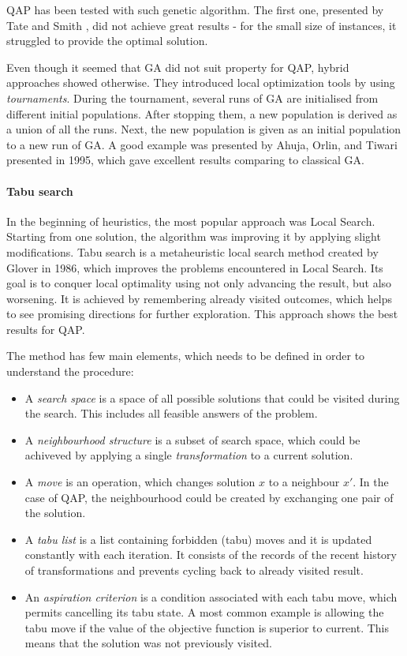 QAP has been tested with such genetic algorithm.
The first one, presented by Tate and Smith \cite{tate1995genetic}, did not achieve great results - for the small size of instances, it struggled to provide the optimal solution.

Even though it seemed that GA did not suit property for QAP, hybrid approaches showed otherwise.
They introduced local optimization tools by using \textit{tournaments}.
During the tournament, several runs of GA are initialised from different initial populations.
After stopping them, a new population is derived as a union of all the runs.
Next, the new population is given as an initial population to a new run of GA.
A good example was presented by Ahuja, Orlin, and Tiwari \cite{ahuja2000greedy} presented in 1995, which gave excellent results comparing to classical GA.

\paragraph{Tabu search}

In the beginning of heuristics, the most popular approach was Local Search.
Starting from one solution, the algorithm was improving it by applying slight modifications.
Tabu search is a metaheuristic local search method created by Glover \cite{glover1986future} in 1986, which improves the problems encountered in Local Search.
Its goal is to conquer local optimality using not only advancing the result, but also worsening.
It is achieved by remembering already visited outcomes, which helps to see promising directions for further exploration.
This approach shows the best results for QAP.

The method has few main elements, which needs to be defined in order to understand the procedure:
\begin{itemize}
  \item A \textit{search space} is a space of all possible solutions that could be visited during the search. This includes all feasible answers of the problem.
  \item A \textit{neighbourhood structure} is a subset of search space, which could be achiveved by applying a single \textit{transformation} to a current solution.
  \item A \textit{move} is an operation, which changes solution $x$ to a neighbour $x'$. In the case of QAP, the neighbourhood could be created by exchanging one pair of the solution.
  \item A \textit{tabu list} is a list containing forbidden (tabu) moves and it is updated constantly with each iteration. It consists of the records of the recent history of transformations and prevents cycling back to already visited result.
  \item An \textit{aspiration criterion} is a condition associated with each tabu move, which permits cancelling its tabu state. A most common example is allowing the tabu move if the value of the objective function is superior to current. This means that the solution was not previously visited.
\end{itemize}

